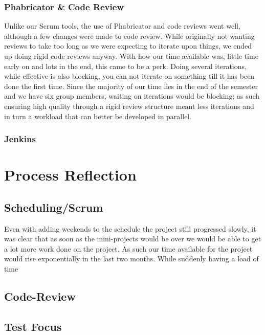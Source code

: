 \subsubsection{Phabricator \& Code Review}
Unlike our Scrum tools, the use of Phabricator and code reviews went well, although a few changes were made to code review.
While originally not wanting reviews to take too long as we were expecting to iterate upon things, we ended up doing rigid code reviews anyway.
With how our time available was, little time early on and lots in the end, this came to be a perk.
Doing several iterations, while effective is also blocking, you can not iterate on something till it has been done the first time.
Since the majority of our time lies in the end of the semester and we have six group members, waiting on iterations would be blocking; as such ensuring high quality through a rigid review structure meant less iterations and in turn a workload that can better be developed in parallel.
\subsubsection{Jenkins}
\section{Process Reflection}
\subsection{Scheduling/Scrum}
Even with adding weekends to the schedule the project still progressed slowly, it was clear that as soon as the mini-projects would be over we would be able to get a lot more work done on the project.
As such our time available for the project would rise exponentially in the last two months.
While suddenly having a load of time
\subsection{Code-Review}
\subsection{Test Focus}
\subsection{}
